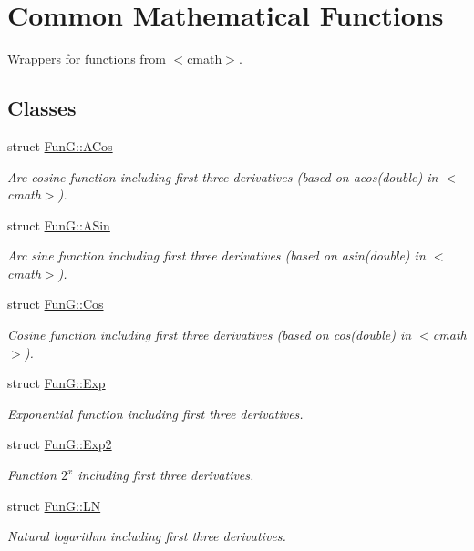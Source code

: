 \hypertarget{group__CMathGroup}{}\section{Common Mathematical Functions}
\label{group__CMathGroup}


Wrappers for functions from $<$cmath$>$.  


\subsection*{Classes}
\begin{DoxyCompactItemize}
\item 
struct \hyperlink{structFunG_1_1ACos}{Fun\+G\+::\+A\+Cos}
\begin{DoxyCompactList}\small\item\em Arc cosine function including first three derivatives (based on acos(double) in $<$cmath$>$). \end{DoxyCompactList}\item 
struct \hyperlink{structFunG_1_1ASin}{Fun\+G\+::\+A\+Sin}
\begin{DoxyCompactList}\small\item\em Arc sine function including first three derivatives (based on asin(double) in $<$cmath$>$). \end{DoxyCompactList}\item 
struct \hyperlink{structFunG_1_1Cos}{Fun\+G\+::\+Cos}
\begin{DoxyCompactList}\small\item\em Cosine function including first three derivatives (based on cos(double) in $<$cmath$>$). \end{DoxyCompactList}\item 
struct \hyperlink{structFunG_1_1Exp}{Fun\+G\+::\+Exp}
\begin{DoxyCompactList}\small\item\em Exponential function including first three derivatives. \end{DoxyCompactList}\item 
struct \hyperlink{structFunG_1_1Exp2}{Fun\+G\+::\+Exp2}
\begin{DoxyCompactList}\small\item\em Function $2^x$ including first three derivatives. \end{DoxyCompactList}\item 
struct \hyperlink{structFunG_1_1LN}{Fun\+G\+::\+LN}
\begin{DoxyCompactList}\small\item\em Natural logarithm including first three derivatives. \end{DoxyCompactList}\item 

\end{DoxyCompactItemize}

